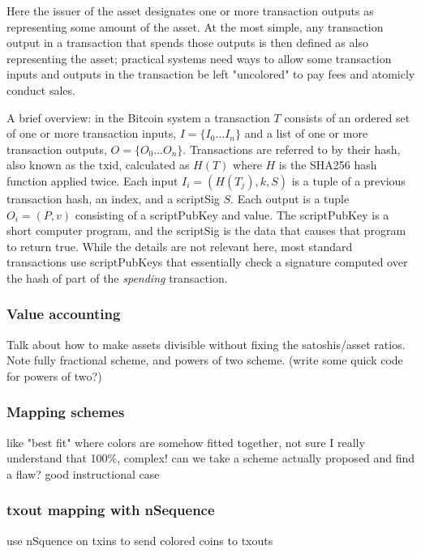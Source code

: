\documentclass{article}
\begin{document}
Here the issuer of the asset designates one or more transaction outputs as
representing some amount of the asset. At the most simple, any transaction
output in a transaction that spends those outputs is then defined as also
representing the asset; practical systems need ways to allow some transaction
inputs and outputs in the transaction be left "uncolored" to pay fees and
atomicly conduct sales.




A brief overview: in the Bitcoin system a transaction $T$ consists of an
ordered set of one or more transaction inputs, $I=\{I_0 ... I_n\}$ and a list
of one or more transaction outputs, $O=\{O_0 ... O_n\}$. Transactions are
referred to by their hash, also known as the $\mathrm{txid}$, calculated as
$H(T)$ where $H$ is the SHA256 hash function applied twice. Each input $I_i =
(H(T_j), k, S)$ is a tuple of a previous transaction hash, an index, and a
scriptSig $S$. Each output is a tuple $O_i = (P, v)$ consisting of a
scriptPubKey and value. The scriptPubKey is a short computer program, and the
scriptSig is the data that causes that program to return true. While the
details are not relevant here, most standard transactions use scriptPubKeys
that essentially check a signature computed over the hash of part of the
\emph{spending} transaction.


\subsubsection{Value accounting}

Talk about how to make assets divisible without fixing the satoshis/asset
ratios. Note fully fractional scheme, and powers of two scheme. (write some
quick code for powers of two?)



\subsubsection{Mapping schemes}

like "best fit" where colors are somehow fitted together, not sure I really
understand that 100\%, complex! can we take a scheme actually proposed and find
a flaw? good instructional case


\subsubsection{txout mapping with nSequence}

use nSquence on txins to send colored coins to txouts
\end{document}

